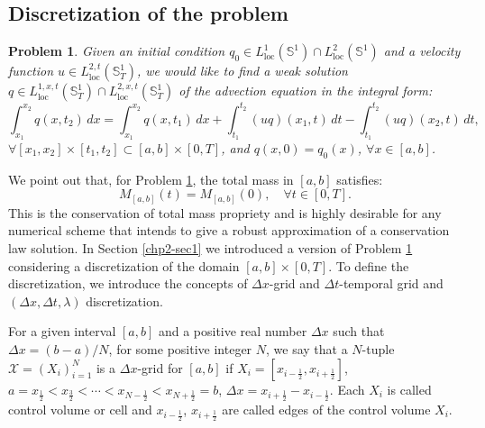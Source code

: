 \subsection{Discretization of the problem}
\theoremstyle{plain} 
\newtheorem{prob}{Problem}[chapter]
\begin{prob}
	\label{chp2-sec2-prob1}
	Given an initial condition ${q}_0\in {L}^{1}_{\text{loc}}(\mathbb{S}^1) \cap {L}^{2}_{\text{loc}}(\mathbb{S}^1)$ and
	a velocity function $u \in {L}^{2,t}_{\text{loc}}(\mathbb{S}^1_{T})$,
	we would like to find a weak solution ${q} \in {L}^{1,x,t}_{\text{loc}}(\mathbb{S}^1_{T}) \cap {L}^{2,x,t}_{\text{loc}}(\mathbb{S}^1_{T})$
	of the advection equation in the integral form:
	\begin{equation*}
	        \int_{x_1}^{x_2} {q}(x, t_2) \,dx = 
       		\int_{x_1}^{x_2} {q}(x, t_1) \,dx + 
        	\int_{t_1}^{t_2} {(uq)}(x_1, t) \,dt -
		\int_{t_1}^{t_2}{(uq)}(x_2, t) \,dt ,
	\end{equation*}
	$\forall [x_1, x_2]\times[t_1, t_2] \subset [a,b] \times [0,T]$, 
	and
	${q}(x,0) = {q}_0(x)$, $\forall x \in [a,b]$.
\end{prob}
We point out that, for Problem \ref{chp2-sec2-prob1}, 
the total mass in $[a,b]$ satisfies: 
\begin{equation}
	{M}_{[a,b]}(t) = {M}_{[a,b]}(0), \quad \forall t \in [0,T].
\end{equation}
This is the conservation of total mass propriety and is highly desirable
for any numerical scheme that intends to give a robust approximation of a
conservation law solution.
In Section \ref{chp2-sec1} we introduced a version of Problem \ref{chp2-sec2-prob1}
considering a discretization of the domain $[a,b] \times [0,T]$. 
To define the discretization, we introduce the concepts of $\Delta x$-grid and $\Delta t$-temporal grid and $(\Delta x, \Delta t, \lambda)$ discretization.
\begin{definition}
	\label{chp2-def-1dgrid}
	For a given interval $[a,b]$ and a positive real number $\Delta x$ such that $\Delta x = (b-a)/N$, for some positive integer $N$,
	we say that a $N$-tuple $\mathcal{X}=(X_i)_{i=1}^N$ is a $\Delta x$-grid for $[a,b]$ if
	$X_i = [x_{i-\frac{1}{2}}, x_{i+\frac{1}{2}}]$, 
	$a = x_{\frac{1}{2}} < x_{\frac{3}{2}} < \cdots < x_{N-\frac{1}{2}} < x_{N+\frac{1}{2}} = b$,
	$\Delta x = x_{i+\frac{1}{2}}-x_{i-\frac{1}{2}}$. Each $X_i$ is called control volume or cell and
	$x_{i-\frac{1}{2}}$, $x_{i+\frac{1}{2}}$ are called edges of the control volume $X_i$.
\end{definition}
